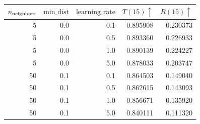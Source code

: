 \begin{tabular}{rrrrr}
\toprule
$n_{\rm neighbors}$ & $\mathrm{min\_dist}$ & $\mathrm{learning\_rate}$ & $T(15)\uparrow$ & $R(15)\uparrow$ \\
\midrule
5 & 0.0 & 0.1 & 0.895908 & 0.230373 \\
5 & 0.0 & 0.5 & 0.893360 & 0.226933 \\
5 & 0.0 & 1.0 & 0.890139 & 0.224227 \\
5 & 0.0 & 5.0 & 0.878033 & 0.203747 \\
50 & 0.1 & 0.1 & 0.864503 & 0.149040 \\
50 & 0.1 & 0.5 & 0.862615 & 0.143093 \\
50 & 0.1 & 1.0 & 0.856671 & 0.135920 \\
50 & 0.1 & 5.0 & 0.840111 & 0.111320 \\
\bottomrule
\end{tabular}
